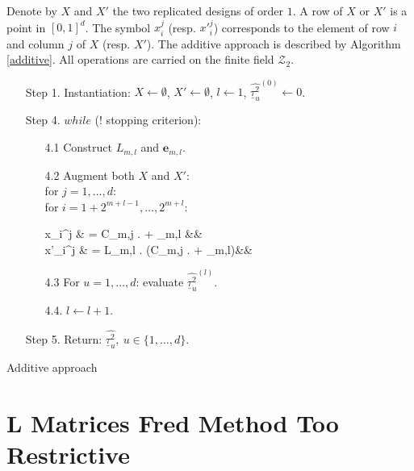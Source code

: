 \documentclass[]{elsarticle}
\theoremstyle{definition}
\newcommand{\bvec}[1]{\boldsymbol{#1}}
\newcommand{\vi}{\bvec{i}}
\newcommand{\ve}{\bvec{e}}
\begin{document}
Denote by $X$ and $X'$ the two replicated designs of order $1$.
A row of $X$ or $X'$ is a point in $[0,1]^d$. The symbol $x_i^j$ (resp. ${x'}_i^j$) corresponds to  the element of row $i$ and column $j$ of $X$ (resp. $X'$). The additive approach is described by Algorithm \ref{additive}. All operations are carried on the finite field $\mathcal{Z}_2$.
\begin{algorithm}[!ht]

\begin{center}
\begin{minipage}{10cm}
\begin{enumerate}
\item[Step 1.] Instantiation: $X \leftarrow \emptyset$, $X' \leftarrow \emptyset$, $l \leftarrow 1$, $\widehat{\underline{\tau}_u^2}^{(0)} \leftarrow 0$.
\item[Step 4.] $while$ ($!$ stopping criterion):
\begin{enumerate}
\item[4.1] Construct $L_{m,l}$ and $\ve_{m,l}$.
\item[4.2] Augment both $X$ and $X'$:\\
for $j=1,\dots,d$:\\
for $i=1+2^{m+l-1},\dots,2^{m+l}$:
\begin{flalign*}
x_i^j & = C_{m,j} . \vi + \ve_{m,l} && \\
{x'}_i^j & = L_{m,l} . (C_{m,j} . \vi +  \ve_{m,l})&&
\end{flalign*}
\item[4.3] For $u=1,\dots,d$: evaluate $\widehat{\underline{\tau}_u^2}^{(l)}.$ 
\item[4.4.]  $l \leftarrow l+1.$
\end{enumerate}
\item[Step 5.] Return: $\widehat{\underline{\tau}_u^2}, \ u \in \{1,\dots,d\}.$ 
\end{enumerate}
\end{minipage}
\end{center}
\label{additive}
\caption{Additive approach}
\end{algorithm}



\section{L Matrices Fred Method Too Restrictive}
\end{document}
